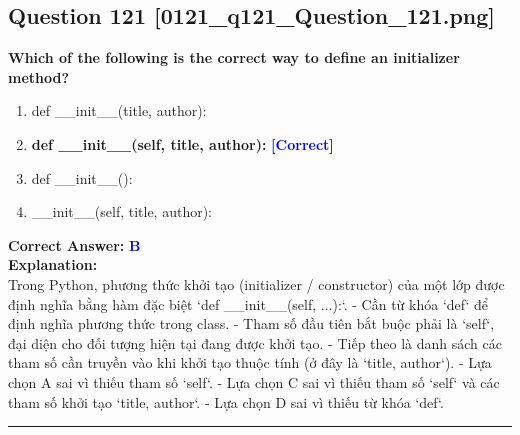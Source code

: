 \documentclass[11pt,a4paper]{article}
\begin{document}
\begin{minipage}{\textwidth}
\subsection*{Question 121 \quad \footnotesize{[0121_q121_Question_121.png]}}
\noindent \textbf{Which of the following is the correct way to define an initializer method?}

\begin{enumerate}[label=\Alph*.]
    \item def __init__(title, author):
    \item \textbf{def __init__(self, title, author):} \hfill \textcolor{blue}{\textbf{[Correct]}}
    \item def __init__():
    \item __init__(self, title, author):
\end{enumerate}

\noindent \textbf{Correct Answer:} \textcolor{blue}{\textbf{B}} \\[4pt]
\noindent \textbf{Explanation:}\\
Trong Python, phương thức khởi tạo (initializer / constructor) của một lớp được định nghĩa bằng hàm đặc biệt `def __init__(self, ...):`.\newline
- Cần từ khóa `def` để định nghĩa phương thức trong class.\newline
- Tham số đầu tiên bắt buộc phải là `self`, đại diện cho đối tượng hiện tại đang được khởi tạo.\newline
- Tiếp theo là danh sách các tham số cần truyền vào khi khởi tạo thuộc tính (ở đây là `title, author`).\newline
- Lựa chọn A sai vì thiếu tham số `self`.\newline
- Lựa chọn C sai vì thiếu tham số `self` và các tham số khởi tạo `title, author`.\newline
- Lựa chọn D sai vì thiếu từ khóa `def`.
\end{minipage}
\vspace{0.8cm}
\hrule
\vspace{0.5cm}
\end{document}

